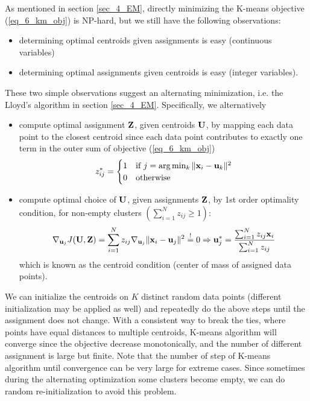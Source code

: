 \documentclass[../book-template.tex]{subfiles}
\begin{document}
\par As mentioned in section \ref{sec_4_EM}, directly minimizing the K-means objective (\ref{eq_6_km_obj}) is NP-hard, but we still have the following observations:
\begin{itemize}
	\item determining optimal centroids given assignments is easy (continuous variables)
	\item determining optimal assignments given centroids is easy (integer variables).
\end{itemize}
These two simple observations suggest an alternating minimization, i.e. the Lloyd's algorithm in section \ref{sec_4_EM}. Specifically, we alternatively
\begin{itemize}
	\item compute optimal assignment ${\bf Z}$, given centroids ${\bf U}$, by mapping each data point to the closest centroid since each data point contributes to exactly one term in the outer sum of objective (\ref{eq_6_km_obj})
	\begin{equation*}
		z_{ij}^*=\begin{cases}
		1&\text{if }j=\arg\min_k\|{\bf x}_i-{\bf u}_k\|^2\\
		0&\text{otherwise}
		\end{cases}
	\end{equation*}
	\item compute optimal choice of ${\bf U}$, given assignments ${\bf Z}$, by 1st order optimality condition, for non-empty clusters $(\sum_{i=1}^{N}z_{ij}\geq 1)$:
	\begin{equation*}
		\nabla_{{\bf u}_j}J({\bf U,Z})=\sum_{i=1}^{N}z_{ij}\nabla_{{\bf u}_j}\|{\bf x}_i-{\bf u}_j\|^2\overset{!}{=}0\Rightarrow {\bf u}_j^* =\frac{\sum_{i=1}^{N}z_{ij} {\bf x}_i}{\sum_{i=1}^{N}z_{ij}}
	\end{equation*}
	which is known as the centroid condition (center of mass of assigned data points).
\end{itemize}
We can initialize the centroids on $K$ distinct random data points (different initialization may be applied as well) and repeatedly do the above steps until the assignment does not change. With a consistent way to break the ties, where points have equal distances to multiple centroids, K-means algorithm will converge since the objective decrease monotonically, and the number of different assignment is large but finite. Note that the number of step of K-means algorithm until convergence can be very large for extreme cases. Since sometimes during the alternating optimization some clusters become empty, we can do random re-initialization to avoid this problem.
\end{document}
